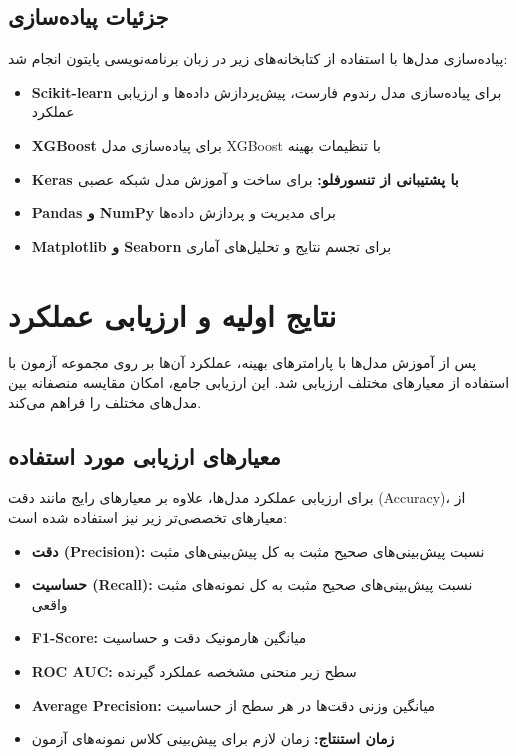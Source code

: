 \subsection{جزئیات پیاده‌سازی}
پیاده‌سازی مدل‌ها با استفاده از کتابخانه‌های زیر در زبان برنامه‌نویسی پایتون انجام شد:

\begin{itemize}
    \item \textbf{Scikit-learn} برای پیاده‌سازی مدل رندوم فارست، پیش‌پردازش داده‌ها و ارزیابی عملکرد
    \item \textbf{XGBoost} برای پیاده‌سازی مدل XGBoost با تنظیمات بهینه
    \item \textbf{Keras با پشتیبانی از تنسورفلو:} برای ساخت و آموزش مدل شبکه عصبی
    \item \textbf{Pandas و NumPy} برای مدیریت و پردازش داده‌ها
    \item \textbf{Matplotlib و Seaborn} برای تجسم نتایج و تحلیل‌های آماری
\end{itemize}


\section{نتایج اولیه و ارزیابی عملکرد}
پس از آموزش مدل‌ها با پارامترهای بهینه، عملکرد آن‌ها بر روی مجموعه آزمون با استفاده از معیارهای مختلف ارزیابی شد. این ارزیابی جامع، امکان مقایسه منصفانه بین مدل‌های مختلف را فراهم می‌کند.

\subsection{معیارهای ارزیابی مورد استفاده}
برای ارزیابی عملکرد مدل‌ها، علاوه بر معیارهای رایج مانند دقت (Accuracy)، از معیارهای تخصصی‌تر زیر نیز استفاده شده است:

\begin{itemize}
    \item \textbf{دقت (Precision):} نسبت پیش‌بینی‌های صحیح مثبت به کل پیش‌بینی‌های مثبت
    \item \textbf{حساسیت (Recall):} نسبت پیش‌بینی‌های صحیح مثبت به کل نمونه‌های مثبت واقعی
    \item \textbf{F1-Score:} میانگین هارمونیک دقت و حساسیت
    \item \textbf{ROC AUC:} سطح زیر منحنی مشخصه عملکرد گیرنده
    \item \textbf{Average Precision:} میانگین وزنی دقت‌ها در هر سطح از حساسیت
    \item \textbf{زمان استنتاج:} زمان لازم برای پیش‌بینی کلاس نمونه‌های آزمون
\end{itemize}

